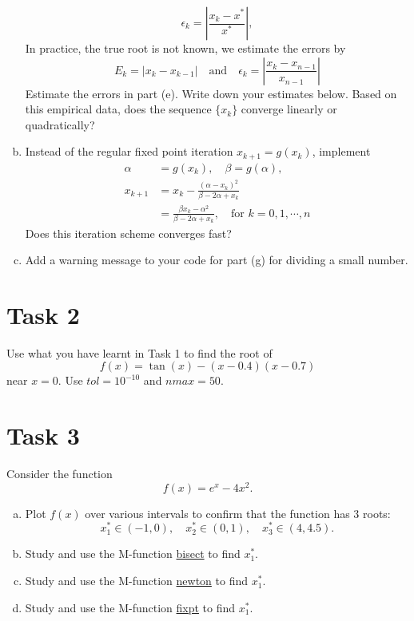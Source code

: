 \begin{enumerate}[(a)]
	\[ \epsilon_k=\left|\frac{x_k-x^*}{x^*}\right|, \]
	In practice, the true root is not known, we estimate the errors by
	\[ E_k=|x_k-x_{k-1}| \quad \text{and} \quad  \epsilon_k=\left|\frac{x_k-x_{n-1}}{x_{n-1}}\right|\]
	Estimate the errors in part (e).
	Write down your estimates below.
	Based on this empirical data, does the sequence \(\{x_k\}\) converge linearly or quadratically?
	\item Instead of the regular fixed point iteration \(x_{k+1} = g(x_k)\), implement
	\begin{align*}
	\alpha &= g(x_k), \quad \beta = g(\alpha), \\
	x_{k+1}&=x_k-\frac{(\alpha-x_k)^2}{\beta-2\alpha+x_k}\\
		&=\frac{\beta x_k-\alpha^2}{\beta-2\alpha+x_k}, \quad \text{for } k=0,1,\cdots,n
	\end{align*}
	Does this iteration scheme converges fast?
	\item Add a warning message to your code for part (g) for dividing a small number.
\end{enumerate}


\section*{Task 2}
Use what you have learnt in Task 1 to find the root of
\[ f(x)=\tan(x)-(x-0.4)(x-0.7) \]
near \(x = 0\).
Use \(tol= 10^{-10}\) and \(nmax = 50\).


\section*{Task 3}
Consider the function
\[ f(x) = e^x - 4x^2. \]
\begin{enumerate}[(a)]
	\item Plot \(f(x)\) over various intervals to confirm that the function has 3 roots:
	\[ x_1^*\in(-1,0), \quad x_2^*\in(0,1), \quad x_3^*\in(4,4.5). \]
	\item Study and use the M-function \hyperref[bisect]{bisect} to find \(x_1^*\).
	\item Study and use the M-function \hyperref[newton]{newton} to find \(x_1^*\).
	\item Study and use the M-function \hyperref[fixpt]{fixpt} to find \(x_1^*\).
\end{enumerate}


